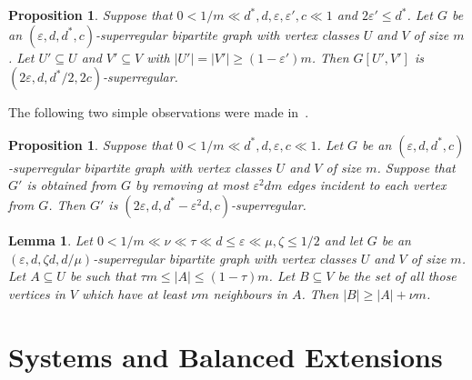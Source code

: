 \documentclass{memo-l}
\newtheorem{prop}[firstthm]{Proposition}
\newtheorem{lemma}[firstthm]{Lemma}
\def\COMMENT#1{}
\def\eps{\varepsilon}
\numberwithin{section}{chapter}
\numberwithin{equation}{section}
\numberwithin{firstthm}{section}
\numberwithin{figure}{section}
\begin{document}
{\begin{prop} \label{superslice6}
Suppose that $0<1/m \ll  d^*,d, \eps, \eps', c  \ll 1$ and $2\eps'\le d^*$.
Let $G$ be an $(\eps,d,d^*,c)$-superregular bipartite graph with vertex classes
$U$ and $V$ of size $m$. 
Let $U' \subseteq U$ and $V' \subseteq V$ with $|U'|=|V'| \ge (1- \eps')m$.
Then $G[U',V']$ is $(2\eps,d, d^*/2 ,2c)$-superregular.%
   \COMMENT{Let $m':= |U'| = |V'|$, so $(1- \eps')m \le m' \le m$.
Since $ 2\eps m'\ge \frac{\eps m'}{1- \eps'} \ge \eps m$, $G[U',V']$ satisfies (Reg1)--(Reg3).
To see (Reg4) note that the degrees in $G'$ are still at least $d^*m-\eps' m \ge d^* m'/2$.}
\end{prop}


The following two simple observations were made in~\cite{Kelly}.
\begin{prop} \label{superslice5}
Suppose that $0<1/m \ll d^*,d, \eps, c\ll 1$. Let $G$ be an $(\eps,d,d^*,c)$-superregular bipartite graph with vertex classes
$U$ and $V$ of size $m$. Suppose that $G'$ is obtained from $G$ by removing
at most $\eps^2 dm$ edges incident to each vertex from $G$.
Then $G'$ is $(2\eps,d,d^*-\eps^2 d,c)$-superregular.
\end{prop}


\begin{lemma}\label{regtoexpander}
Let $0<1/m\ll \nu\ll \tau\ll d\le \eps\ll \mu,\zeta \le 1/2$ and let $G$ be an
$(\eps,d,\zeta d,d/\mu)$-superregular bipartite graph with vertex classes $U$ and $V$ of size $m$. Let $A\subseteq U$ be such that
$\tau m\le |A|\le (1-\tau) m$. Let $B\subseteq V$ be the set of all those vertices in $V$ which have at least $\nu m$ neighbours in $A$.
Then $|B|\ge |A|+\nu m$.
\end{lemma}













\section{Systems and Balanced Extensions} \label{systembalanced}
}
\end{document}
